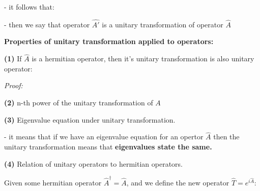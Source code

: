 \documentclass{article}
\begin{document}
- it follows that:


- then we say that operator $\hat{A'}$ is a unitary transformation of operator $\hat{A}$

\textbf{Properties of unitary transformation applied to operators:}

\textbf{(1)} If $\hat{A}$ is a hermitian operator, then it's unitary transformation is also unitary operator:


\textit{Proof:}



\textbf{(2)} n-th power of the unitary transformation of $A$


\textbf{(3)} Eigenvalue equation under unitary transformation.


- it means that if we have an eigenvalue equation for an opertor $\hat{A}$ then the unitary transformation means that \textbf{eigenvalues state the same.}


\textbf{(4)} Relation of unitary operators to hermitian operators.


Given some hermitian operator $\hat{A}^\dag = \hat{A}$, and we define the new operator $\hat{T} = e^{i\hat{A}}$: 

\end{document}
